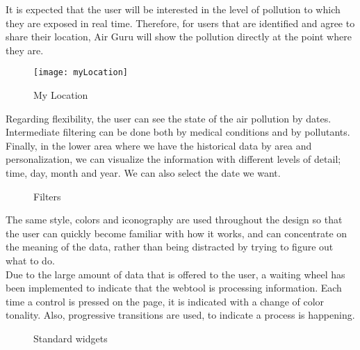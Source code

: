It is expected that the user will be interested in the level of pollution to which they are exposed in real time. Therefore, for users
that are identified and agree to share their location, Air Guru will show the pollution directly at the point where they are.\\

\begin{figure}[ht]
    \centering
    \texttt{[image: myLocation]}
    \caption{My Location}
\end{figure}

Regarding flexibility, the user can see the state of the air pollution by dates. Intermediate filtering can be done both by medical conditions and by pollutants. Finally, in the lower area where we have
the historical data by area and personalization, we can visualize the information with different levels of detail; time, day, month and year. We can also
select the date we want.\\

\begin{figure}[ht]
    \centering
    \hfill
    \vfill
    \caption{Filters}
\end{figure}

The same style, colors and iconography are used throughout the design so that the user can quickly become familiar with how it works, and can
concentrate on the meaning of the data, rather than being distracted by trying to figure out what to do.\\

Due to the large amount of data that is offered to the user, a waiting wheel has been implemented to indicate
that the webtool is processing information. Each time a control is pressed on the page, it is indicated with a change
of color tonality. Also, progressive transitions are used, to indicate a process is happening.

\begin{figure}[ht]
    \centering
    \hfill
    \vfill
    \hfill
    \caption{Standard widgets}
\end{figure}

